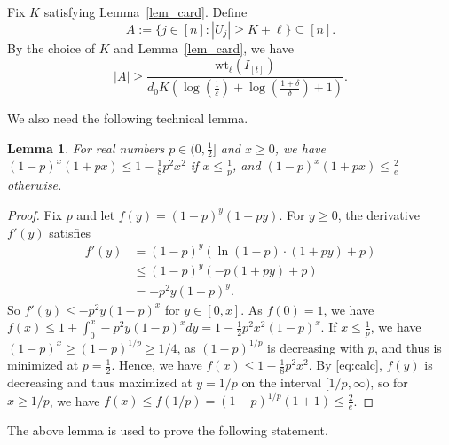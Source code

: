 \documentclass[11pt]{article}
\newtheorem{lemma}[theorem]{Lemma}
\renewcommand{\epsilon}{\varepsilon}
\newcommand\ind[1]{^{(#1)}}
\begin{document}
Fix $K$ satisfying Lemma~\ref{lem_card}. Define
\[
A:=\{j\in [n] : |U_j|\geq K+\ell\}\subseteq [n].
\]
By the choice of $K$ and Lemma~\ref{lem_card}, we have
\begin{equation}\label{eq_boundA}
|A|\geq \frac{\mathrm{wt}_\ell(I_{[t]})}{d_0 K(\log(\frac{1}{\epsilon})+\log( \frac{1+\delta}{\delta })+1)}.
\end{equation}



We also need the following technical lemma.

  \begin{lemma}
    For real numbers $p\in(0,\frac{1}{2}]$ and $x\ge 0$, we have $(1-p)^x(1+px)\le 1-\frac{1}{8}p^2x^2$ if $x\le \frac{1}{p}$, and $(1-p)^x(1+px)\le \frac{2}{e}$ otherwise.
  \label{lem:calc}
  \end{lemma}
  \begin{proof}
    Fix $p$ and let $f(y) = (1-p)^y(1+py)$.
    For $y\geq 0$, the derivative $f'(y)$ satisfies
    \begin{equation} \label{eq:calc}
    \begin{aligned}
    f'(y) & =  (1-p)^y(\ln(1-p)\cdot (1+py) + p)\\ & \le (1-p)^y(-p(1+py)+p)\\
    & = -p^2y(1-p)^y.
    \end{aligned}
    \end{equation}
    So $f'(y) \le -p^2y(1-p)^x$ for $y\in [0,x]$.
    As $f(0)=1$, we have $f(x)\le 1+\int_{0}^{x} -p^2y(1-p)^x dy = 1-\frac{1}{2}p^2x^2(1-p)^x$.
    If $x\le \frac{1}{p}$, we have $(1-p)^x\ge (1-p)^{1/p}\ge 1/4$, as $(1-p)^{1/p}$ is decreasing with $p$, and thus is minimized at $p=\frac{1}{2}$.
    Hence, we have $f(x)\le 1-\frac{1}{8}p^2x^2$.
    By \eqref{eq:calc}, $f(y)$ is decreasing and thus maximized at $y=1/p$ on the interval $[1/p,\infty)$, so for $x\ge 1/p$, we have $f(x)\le f(1/p) =(1-p)^{1/p}(1+1) \le \frac{2}{e}$.
  \end{proof}

The above lemma is used to prove the following statement.
\end{document}
